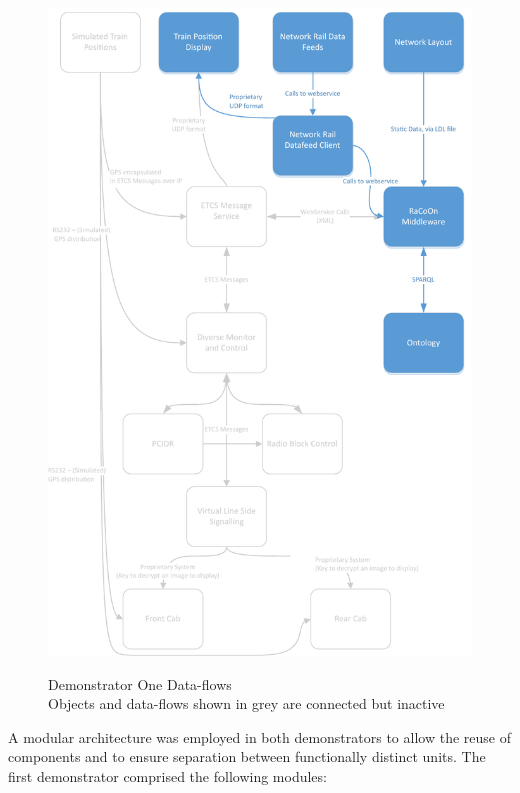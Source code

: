 \begin{figure}[H]
\myfloatalign
{\includegraphics[max height=\textheight,max width=\linewidth]{gfx/Dataflow-StirPassiveDemo}} 
\caption[Demonstrator One Data-flows]{Demonstrator One Data-flows \\ Objects and data-flows shown in grey are connected but inactive}
\label{fig:DemoOne-DataFlow}
\end{figure}


A modular architecture was employed in both demonstrators to allow the reuse of components and to ensure separation between functionally distinct units. The first demonstrator comprised the following modules:

